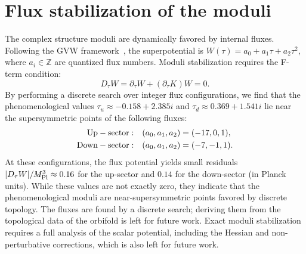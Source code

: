 \documentclass[12pt,a4paper]{article}
\numberwithin{equation}{section}
\begin{document}
\section{Flux stabilization of the moduli}
The complex structure moduli are dynamically favored by internal fluxes. Following the GVW framework~\cite{GVW2000}, the superpotential is \(W(\tau) = a_0 + a_1\tau + a_2\tau^2\), where \(a_i \in \mathbb{Z}\) are quantized flux numbers. Moduli stabilization requires the F-term condition:
\begin{equation}
D_{\tau}W = \partial_{\tau}W + (\partial_{\tau}K)W = 0.
\end{equation}
By performing a discrete search over integer flux configurations, we find that the phenomenological values \(\tau_u \approx -0.158 + 2.385i\) and \(\tau_d \approx 0.369 + 1.541i\) lie near the supersymmetric points of the following fluxes:
\begin{equation}
\begin{split}
{\rm Up-sector:}&\quad (a_0,a_1,a_2) = (-17,0,1),\\
{\rm Down-sector:}&\quad (a_0,a_1,a_2) = (-7,-1,1).
\end{split}
\end{equation}
At these configurations, the flux potential yields small residuals \(|D_\tau W|/M_{\rm Pl}^3 \approx 0.16\) for the up-sector and \(0.14\) for the down-sector (in Planck units). While these values are not exactly zero, they indicate that the phenomenological moduli are near-supersymmetric points favored by discrete topology. The fluxes are found by a discrete search; deriving them from the topological data of the orbifold is left for future work. Exact moduli stabilization requires a full analysis of the scalar potential, including the Hessian and non-perturbative corrections, which is also left for future work.
\end{document}
